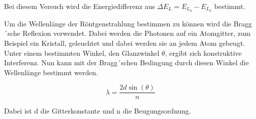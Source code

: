 Bei diesem Versuch wird die Energiedifferenz aus $\Delta E_L = E_{L_2} - E_{L_3}$
bestimmt.

Um die Wellenlänge der Röntgenstrahlung bestimmen zu können wird die Bragg´sche
Reflexion verwendet. Dabei werden die Photonen auf ein Atomgitter, zum Beispiel
ein Kristall, geleuchtet und dabei werden sie an jedem Atom gebeugt. Unter einem
bestimmten Winkel, den Glanzwinkel $\theta$, ergibt sich konstruktive Interferenz.
Nun kann mit der Bragg´schen Bedingung durch diesen Winkel die Wellenlänge bestimmt werden.

\begin{equation}
  \lambda = \frac{2d \sin(\theta)}{n}
  \label{eq:5}
\end{equation}

Dabei ist d die Gitterkonstante und n die Beugungsordnung.
